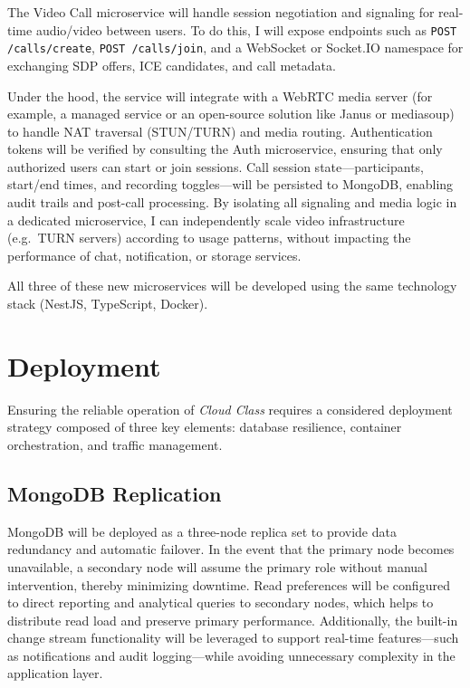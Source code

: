 The Video Call microservice will handle session negotiation and signaling for real-time audio/video between users.  To do this, I will expose endpoints such as \texttt{POST /calls/create}, \texttt{POST /calls/join}, and a WebSocket or Socket.IO namespace for exchanging SDP offers, ICE candidates, and call metadata.

Under the hood, the service will integrate with a WebRTC media server (for example, a managed service or an open-source solution like Janus or mediasoup) to handle NAT traversal (STUN/TURN) and media routing.  Authentication tokens will be verified by consulting the Auth microservice, ensuring that only authorized users can start or join sessions.  Call session state—participants, start/end times, and recording toggles—will be persisted to MongoDB, enabling audit trails and post-call processing.  By isolating all signaling and media logic in a dedicated microservice, I can independently scale video infrastructure (e.g.\ TURN servers) according to usage patterns, without impacting the performance of chat, notification, or storage services.

All three of these new microservices will be developed using the same technology stack (NestJS, TypeScript, Docker).
\section{Deployment}

Ensuring the reliable operation of \emph{Cloud Class} requires a considered deployment strategy composed of three key elements: database resilience, container orchestration, and traffic management.

\subsection{MongoDB Replication}

MongoDB will be deployed as a three-node replica set to provide data redundancy and automatic failover. In the event that the primary node becomes unavailable, a secondary node will assume the primary role without manual intervention, thereby minimizing downtime. Read preferences will be configured to direct reporting and analytical queries to secondary nodes, which helps to distribute read load and preserve primary performance. Additionally, the built-in change stream functionality will be leveraged to support real-time features—such as notifications and audit logging—while avoiding unnecessary complexity in the application layer.

